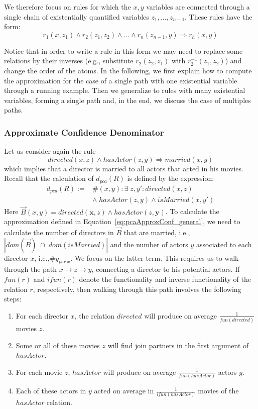 {We therefore focus on rules for which the $x,y$ variables are connected through a single
chain of existentially quantified
variables $z_1,..., z_{n-1}$. These rules have the form:
$$
  r_1(x,z_1) \wedge r_2(z_1,z_2) \wedge ... \wedge r_n(z_{n-1},y) \Rightarrow r_h(x,y)
$$

Notice that in order to write a rule in this form we may need to replace some relations by their inverses
(e.g., substitute $r_2(z_2,z_1)$ with $r_2^{-1}(z_1,z_2)$)
and change the order of the atoms.
In the following, we first explain how to compute the approximation for the case of a single
path with one existential variable through a running example.
Then we generalize to rules with many existential variables, forming a single path and,
in the end, we discuss the case of multiples paths.


\subsubsection{Approximate Confidence Denominator}
Let us consider again the rule
\[
 directed(x,z) \wedge hasActor(z,y) \Rightarrow married(x,y)
\]
which implies that a director is married to all actors that acted in his movies.
Recall that the calculation of $d_{pca}(R)$ is defined by the expression:
\[
\begin{array}{rl}
d_{pca}(R) := &\#(x,y): \exists\; z, y': directed(x,z)  \\
  &\wedge\; hasActor(z,y) \wedge isMarried(x,y') \label{eq:denomPCAExample}
\end{array}
\]
Here $\vec{B}(x, y) = directed(\bm{x},z) \wedge hasActor(z,\bm{y})$.
To calculate the approximation defined in Equation~\ref{eq:pcaApproxConf_general},
we need to calculate the number of directors in $\vec{B}$ that are married, i.e.,
$|dom(\vec{B})\;\cap\;dom(isMarried)|$ and the number of actors $y$
associated to each director $x$, i.e.,$\#y_{per\;x}$.
We focus on the latter term. This requires us to walk through the path $x \rightarrow z \rightarrow y$, connecting a director to his potential actors. If $fun(r)$ and $ifun(r)$
denote the functionality and inverse functionality of the relation $r$, respectively, then
walking through this path involves the following steps:
\begin{enumerate} \itemsep +0.3ex
 \item For each director $x$, the relation $directed$ will produce on average $\frac{1}{fun(directed)}$ movies $z$.
 \item Some or all of these movies $z$ will find join partners in the first argument of $hasActor$.
 \item For each movie $z$, $hasActor$ will produce on average $\frac{1}{fun(hasActor)}$ actors $y$.
 \item Each of these actors in $y$ acted on average in  $\frac{1}{ifun(hasActor)}$ movies of the $hasActor$ relation.
\end{enumerate}

}
